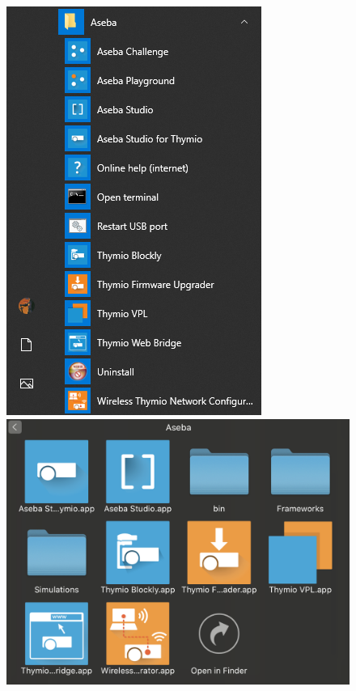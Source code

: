 \documentclass[12pt]{article}
\begin{document}
	\begin{figure}[h]
		\begin{minipage}{0.49\textwidth}
        			\centering
			\includegraphics[width=\textwidth]{img/appsWin.png}
		\end{minipage}\hfill	
		\begin{minipage}{0.49\textwidth}
			\includegraphics[width=\textwidth]{img/appsMac.png}

\end{minipage}
\end{figure}
\end{document}
